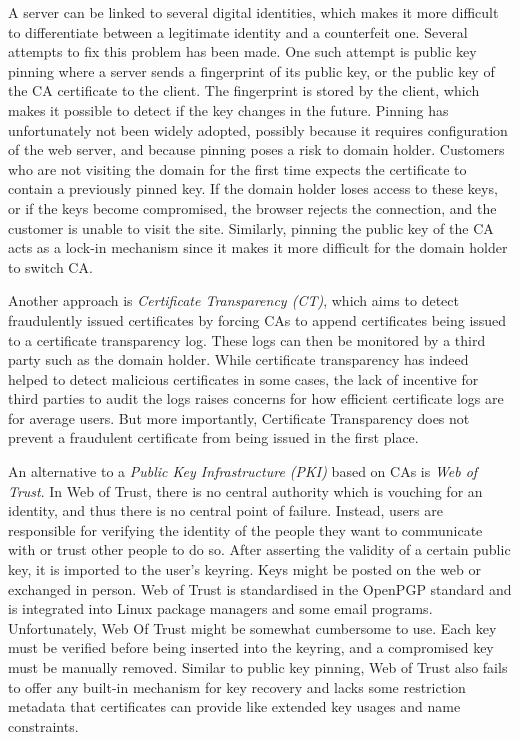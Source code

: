 \documentclass{style/kththesis}
\begin{document}
A server can be linked to several digital identities, which makes it more difficult to differentiate between a legitimate identity and a counterfeit one. Several attempts to fix this problem has been made. One such attempt is public key pinning where a server sends a fingerprint of its public key, or the public key of the CA certificate to the client. The fingerprint is stored by the client, which makes it possible to detect if the key changes in the future. Pinning has unfortunately not been widely adopted, possibly because it requires configuration of the web server, and because pinning poses a risk to domain holder. Customers who are not visiting the domain for the first time expects the certificate to contain a previously pinned key. If the domain holder loses access to these keys, or if the keys become compromised, the browser rejects the connection, and the customer is unable to visit the site. Similarly, pinning the public key of the CA acts as a lock-in mechanism since it makes it more difficult for the domain holder to switch CA.

Another approach is \emph{Certificate Transparency (CT)}, which aims to detect fraudulently issued certificates by forcing CAs to append certificates being issued to a certificate transparency log. These logs can then be monitored by a third party such as the domain holder. While certificate transparency has indeed helped to detect malicious certificates in some cases, the lack of incentive for third parties to audit the logs raises concerns for how efficient certificate logs are for average users. But more importantly, Certificate Transparency does not prevent a fraudulent certificate from being issued in the first place.

An alternative to a \emph{Public Key Infrastructure (PKI)} based on CAs is \emph{Web of Trust}. In Web of Trust, there is no central authority which is vouching for an identity, and thus there is no central point of failure. Instead, users are responsible for verifying the identity of the people they want to communicate with or trust other people to do so. After asserting the validity of a certain public key, it is imported to the user's keyring. Keys might be posted on the web or exchanged in person. Web of Trust is standardised in the OpenPGP standard \cite{RFC4880} and is integrated into Linux package managers and some email programs. Unfortunately, Web Of Trust might be somewhat cumbersome to use. Each key must be verified before being inserted into the keyring, and a compromised key must be manually removed. Similar to public key pinning, Web of Trust also fails to offer any built-in mechanism for key recovery and lacks some restriction metadata that certificates can provide like extended key usages and name constraints.
\end{document}

